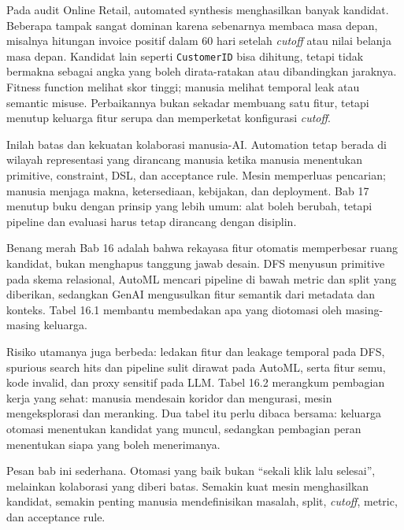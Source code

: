 Pada audit Online Retail, automated synthesis menghasilkan banyak kandidat. Beberapa tampak sangat dominan karena sebenarnya membaca masa depan, misalnya hitungan invoice positif dalam 60 hari setelah \emph{cutoff} atau nilai belanja masa depan. Kandidat lain seperti \passthrough{\lstinline!CustomerID!} bisa dihitung, tetapi tidak bermakna sebagai angka yang boleh dirata-ratakan atau dibandingkan jaraknya. Fitness function melihat skor tinggi; manusia melihat temporal leak atau semantic misuse. Perbaikannya bukan sekadar membuang satu fitur, tetapi menutup keluarga fitur serupa dan memperketat konfigurasi \emph{cutoff}.

Inilah batas dan kekuatan kolaborasi manusia-AI. Automation tetap berada di wilayah representasi yang dirancang manusia ketika manusia menentukan primitive, constraint, DSL, dan acceptance rule. Mesin memperluas pencarian; manusia menjaga makna, ketersediaan, kebijakan, dan deployment. Bab 17 menutup buku dengan prinsip yang lebih umum: alat boleh berubah, tetapi pipeline dan evaluasi harus tetap dirancang dengan disiplin.

\begin{sintesis}

Benang merah Bab 16 adalah bahwa rekayasa fitur otomatis memperbesar ruang kandidat, bukan menghapus tanggung jawab desain. DFS menyusun primitive pada skema relasional, AutoML mencari pipeline di bawah metric dan split yang diberikan, sedangkan GenAI mengusulkan fitur semantik dari metadata dan konteks. Tabel 16.1 membantu membedakan apa yang diotomasi oleh masing-masing keluarga.

Risiko utamanya juga berbeda: ledakan fitur dan leakage temporal pada DFS, spurious search hits dan pipeline sulit dirawat pada AutoML, serta fitur semu, kode invalid, dan proxy sensitif pada LLM. Tabel 16.2 merangkum pembagian kerja yang sehat: manusia mendesain koridor dan mengurasi, mesin mengeksplorasi dan meranking. Dua tabel itu perlu dibaca bersama: keluarga otomasi menentukan kandidat yang muncul, sedangkan pembagian peran menentukan siapa yang boleh menerimanya.

Pesan bab ini sederhana. Otomasi yang baik bukan ``sekali klik lalu selesai'', melainkan kolaborasi yang diberi batas. Semakin kuat mesin menghasilkan kandidat, semakin penting manusia mendefinisikan masalah, split, \emph{cutoff}, metric, dan acceptance rule.

\end{sintesis}

